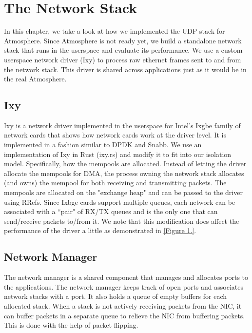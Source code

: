 \chapter{The Network Stack} %

\label{Chapter4} %


In this chapter, we take a look at how we implemented the UDP stack for Atmosphere. Since Atmosphere is not ready yet, we build a standalone network stack that runs in the userspace and evaluate its performance. We use a custom userspace network driver (Ixy) to process raw ethernet frames sent to and from the network stack. This driver is shared across applications just as it would be in the real Atmosphere.

\section{Ixy}

Ixy is a network driver implemented in the userspace for Intel's Ixgbe family of network cards that shows how network cards work at the driver level. It is implemented in a fashion similar to DPDK and Snabb. We use an implementation of Ixy in Rust (ixy.rs) \cite{ixy-rs} and modify it to fit into our isolation model. Specifically, how the mempools are allocated. Instead of letting the driver allocate the mempools for DMA, the process owning the network stack allocates (and owns) the mempool for both receiving and transmitting packets. The mempools are allocated on the "exchange heap" and can be passed to the driver using RRefs. Since Ixbge cards support multiple queues, each network can be associated with a ``pair" of RX/TX queues and is the only one that can send/receive packets to/from it. We note that this modification does affect the performance of the driver a little as demonstrated in \ref{Figure 1.}.

\section{Network Manager}

The network manager is a shared component that manages and allocates ports to the applications. The network manager keeps track of open ports and associates network stacks with a port. It also holds a queue of empty buffers for each allocated stack. When a stack is not actively receiving packets from the NIC, it can buffer packets in a separate queue to relieve the NIC from buffering packets. This is done with the help of packet flipping. 

